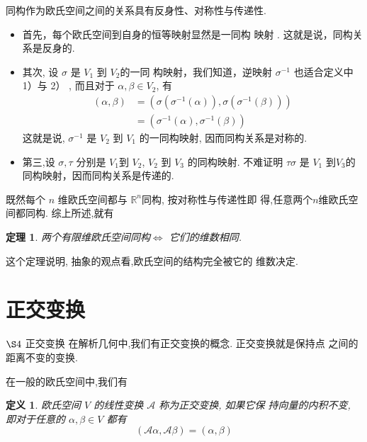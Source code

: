 \documentclass[13pt]{beamer}
\newtheorem{thm}{定理}
\newtheorem*{defi}{定义}
\begin{document}
\begin{frame}
同构作为欧氏空间之间的关系具有反身性、对称性与传递性.

\begin{itemize}
\item  首先，每个欧氏空间到自身的恒等映射显然是一同构 映射 . 这就是说，同构关系是反身的.

\item 其次, 设 $\sigma$ 是 $V_1$ 到 $V_2$的一同 构映射，我们知道，逆映射 $\sigma^{-1}$ 也适合定义中 1）与 2） , 而且对于 ${\alpha}, {\beta} \in V_2$, 有
$$
\begin{aligned}
	({\alpha}, {\beta}) &=\left(\sigma\left(\sigma^{-1}({\alpha})\right), \sigma\left(\sigma^{-1}({\beta})\right)\right) \\
	&=\left(\sigma^{-1}({\alpha}), \sigma^{-1}({\beta})\right)
\end{aligned}
$$
这就是说, $\sigma^{-1}$ 是 $V_2$ 到 $V_1$ 的一同构映射, 因而同构关系是对称的. 

\item 第三,设 $\sigma, \tau$ 分别是 $V_1$到 $V_2$, $V_2$ 到 $V_3$ 的同构映射. 不难证明 $\tau \sigma$ 是 $V_1$ 到$V_3$的同构映射，因而同构关系是传递的.
\end{itemize}

\end{frame}


\begin{frame}

 既然每个 $n$ 维欧氏空间都与 $\mathbb{R}^n$同构, 按对称性与传递性即
得,任意两个$n$维欧氏空间都同构.
综上所述,就有 
\begin{thm}
两个有限维欧氏空间同构$\Longleftrightarrow$ 它们的维数相同.
\end{thm}
这个定理说明, 抽象的观点看,欧氏空间的结构完全被它的 维数决定.

\end{frame}


\section{正交变换}
\begin{frame}{$\S 4$ 正交变换}
在解析几何中,我们有正交变换的概念.
正交变换就是保持点 之间的距离不变的变换.

在一般的欧氏空间中,我们有 
\begin{defi}
欧氏空间 $V$ 的线性变换 $\mathscr{A}$
称为\alert{正交变换}, 如果它保 持向量的内积不变,
即对于任意的 ${\alpha}, {\beta} \in V$ 都有 $$(\mathscr{A} {\alpha}, \mathscr{A} {\beta})=({\alpha}, {\beta})$$
\end{defi}
\end{frame}
\end{document}
